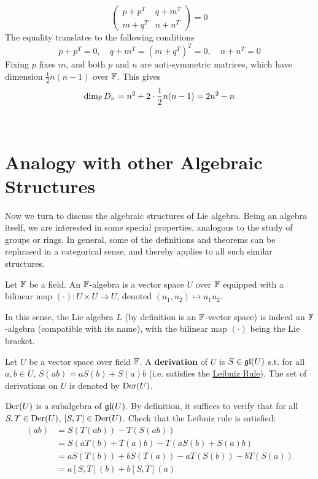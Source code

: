 \documentclass{article}
\begin{document}
\begin{example}
\begin{enumerate}
\[\begin{pmatrix}
                p + p^T & q + m^T \\
                m + q^T & n + n^T
            \end{pmatrix}
            = 0
        \]
        The equality translates to the following conditions
        \[
            p + p^T = 0, \quad
            q + m^T = (m + q^T)^T = 0, \quad
            n + n^T = 0
        \]
        Fixing $p$ fixes $m$, and both $p$ and $n$ are anti-symmetric matrices, which have dimension $\frac{1}{2}n(n-1)$ over $\F$. This gives
        \[
            \dim_{\mathbb{F}} D_n = n^2 + 2 \cdot \frac{1}{2}n(n-1) = 2n^2 - n
        \] 
    \end{enumerate}
    \ 
\end{example}

\section{Analogy with other Algebraic Structures}

\textstart
Now we turn to discuss the algebraic structures of Lie algebra. Being an algebra itself, we are interested in some special properties, analogous to the study of groups or rings. In general, some of the definitions and theorems can be rephrased in a categorical sense, and thereby applies to all such similar structures.

\begin{definition}[$\F$-Algebra]
    Let $\F$ be a field. An $\F$-algebra is a vector space $U$ over $\F$ equipped with a bilinear map $(\cdot): U \times U \to U$, denoted $(u_1, u_2) \mapsto u_1 u_2$.
\end{definition}
\nogap
\begin{remark}
    In this sense, the Lie algebra $L$ (by definition is an $\F$-vector space) is indeed an $\F$-algebra (compatible with its name), with the bilinear map $(\cdot)$ being the Lie bracket.
\end{remark}

\begin{definition}[Derivation]
    Let $U$ be a vector space over field $\F$. A \textbf{derivation} of $U$ is $S \in \mathfrak{gl}(U)$ s.t. for all $a, b \in U$, $S(ab) = a S(b) + S(a) b$ (i.e. satisfies the \underline{Leibniz Rule}). The set of derivations on $U$ is denoted by $\operatorname{Der}(U)$.
\end{definition}

\begin{remark}
    $\operatorname{Der}(U)$ is a subalgebra of $\mathfrak{gl}(U)$. By definition, it suffices to verify that for all $S, T \in \operatorname{Der}(U)$, $[S, T] \in \operatorname{Der}(U)$. Check that the Leibniz rule is satisfied:
    \begin{align*}
        [S, T](ab) &= S(T(ab)) - T(S(ab)) \\
        & = S(aT(b) + T(a)b) - T(aS(b) + S(a)b) \\
        & = aS(T(b)) + bS(T(a)) - aT(S(b)) - bT(S(a)) \\
        & = a[S, T](b) + b[S, T](a)
    \end{align*}
\end{remark}
\end{document}
